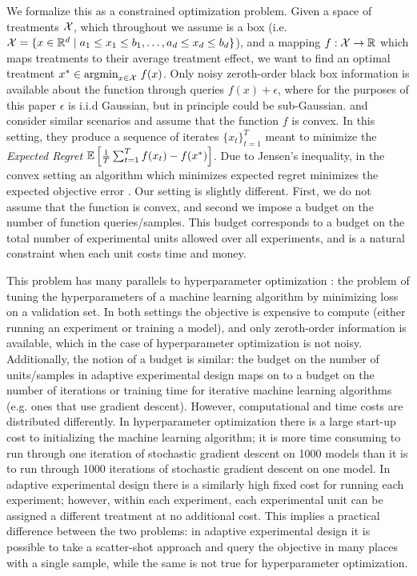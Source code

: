 \documentclass[11pt]{article}
\begin{document}
We formalize this as a constrained optimization problem. Given a space of treatments $\mathcal{X}$, which throughout we assume is a box (i.e. $\mathcal{X} = \{x \in \mathbb{R}^d \mid a_1 \leq x_1 \leq b_1,\ldots, a_d \leq x_d \leq b_d\}$), and a mapping $f:\mathcal{X} \to \mathbb{R}$ which maps treatments to their average treatment effect, we want to find an optimal treatment $x^* \in \text{argmin}_{x \in \mathcal{X}} \; f(x)$. Only noisy zeroth-order black box information is available about the function through queries $f(x) + \epsilon$, where for the purposes of this paper $\epsilon$ is i.i.d Gaussian, but in principle could be sub-Gaussian. \cite{Agarwal2013} and \cite{Shamir2013} consider similar scenarios and assume that the function $f$ is convex. In this setting, they produce a sequence of iterates $\{x_t\}_{t=1}^T$ meant to minimize the {\it Expected Regret} $\mathbb{E}\left[\frac{1}{T}\sum_{t=1}^Tf(x_t) - f(x^*)\right]$. Due to Jensen's inequality, in the convex setting an algorithm which minimizes expected regret minimizes the expected objective error \cite{Agarwal2013, Shamir2013}. Our setting is slightly different. First, we do not assume that the function is convex, and second we impose a budget on the number of function queries/samples. This budget corresponds to a budget on the total number of experimental units allowed over all experiments, and is a natural constraint when each unit costs time and money.

This problem has many parallels to hyperparameter optimization \cite{Li2016, Snoek2012}: the problem of tuning the hyperparameters of a machine learning algorithm by minimizing loss on a validation set. In both settings the objective is expensive to compute (either running an experiment or training a model), and only zeroth-order information is available, which in the case of hyperparameter optimization is not noisy. Additionally, the notion of a budget is similar: the budget on the number of units/samples in adaptive experimental design maps on to a budget on the number of iterations or training time for iterative machine learning algorithms (e.g. ones that use gradient descent). However, computational and time costs are distributed differently. In hyperparameter optimization there is a large start-up cost to initializing the machine learning algorithm; it is more time consuming to run through one iteration of stochastic gradient descent on 1000 models than it is to run through 1000 iterations of stochastic gradient descent on one model. In adaptive experimental design there is a similarly high fixed cost for running each experiment; however, within each experiment, each experimental unit can be assigned a different treatment at no additional cost. This implies a practical difference between the two problems: in adaptive experimental design it is possible to take a scatter-shot approach and query the objective in many places with a single sample, while the same is not true for hyperparameter optimization. 
\end{document}

